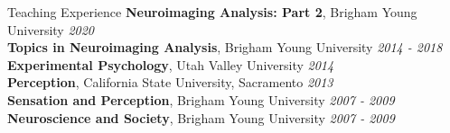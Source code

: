 \documentclass{resume} %
\begin{document}
\begin{rSection}{Teaching Experience}
    {\bf Neuroimaging Analysis: Part 2}, Brigham Young University \hfill {\em 2020}
	\\{\bf Topics in Neuroimaging Analysis}, Brigham Young University \hfill {\em 2014 - 2018}
	\\{\bf Experimental Psychology}, Utah Valley University \hfill {\em 2014}
	\\{\bf Perception}, California State University, Sacramento \hfill {\em 2013}
	\\{\bf Sensation and Perception}, Brigham Young University \hfill {\em 2007 - 2009}
	\\{\bf Neuroscience and Society}, Brigham Young University \hfill {\em 2007 - 2009}
\end{rSection}

\end{document}
